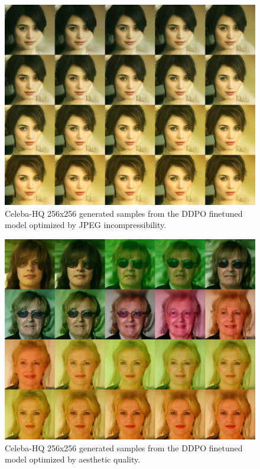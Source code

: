\begin{appendixs}
        \begin{figure}
            \centering
            \includegraphics[scale=1.40]{img/results/incompressibility_28.png}
            \vspace{-0pt}  %
            \captionsetup{width=\textwidth} %
            \caption{Celeba-HQ 256x256 generated samples from the DDPO finetuned model optimized by JPEG incompressibility.}
            \label{fig:ddpm-to-ddpo-incompressibility-extra2}
        \end{figure}

        \begin{figure}
            \centering
            \includegraphics[scale=1.40]{img/results/laion_1.png}
            \vspace{-0pt}  %
            \captionsetup{width=\textwidth} %
            \caption{Celeba-HQ 256x256 generated samples from the DDPO finetuned model optimized by aesthetic quality.}
            \label{fig:ddpm-to-ddpo-aesthetic-extra1}
        \end{figure}



\end{appendixs}
